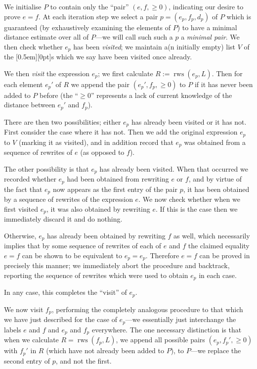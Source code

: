 \documentclass[a4paper]{article}
\DeclareMathOperator{\rws}{rws}
\theoremstyle{plain}
\theoremstyle{definition}
\newcommand{\xx}[1]{{\colorbox{gray!15}{\raisebox{0em}[0.5em][0pt]{\makebox[\width-0.4em]{\texttt{#1}}}}}}
\newcommand{\expr}{\xx{expr}}
\begin{document}
We initialise $P$ to contain only the ``pair'' $(e, f, \geq 0)$, indicating our desire to prove $e = f$. At each iteration step we select a pair $p = (e_p, f_p, d_p)$ of $P$ which is guaranteed (by exhaustively examining the elements of $P$) to have a minimal distance estimate over all of $P$---we will call such such a $p$ a \textit{minimal pair}. We then check whether $e_p$ has been \textit{visited}; we maintain a(n initially empty) list $V$ of the \expr{}s which we say have been visited once already.

We then \textit{visit} the expression $e_p$; we first calculate $R := \rws(e_p, L)$. Then for each element $e_p'$ of $R$ we append the pair $(e_p', f_p, \geq 0)$ to $P$ if it has never been added to $P$ before (the ``$\geq 0$'' represents a lack of current knowledge of the distance between $e_p'$ and $f_p$).

There are then two possibilities; either $e_p$ has already been visited or it has not. First consider the case where it has not. Then we add the original expression $e_p$ to $V$ (marking it as visited), and in addition record that $e_p$ was obtained from a sequence of rewrites of $e$ (as opposed to $f$).

The other possibility is that $e_p$ has already been visited. When that occurred we recorded whether $e_p$ had been obtained from rewriting $e$ or $f$, and by virtue of the fact that $e_p$ now appears as the first entry of the pair $p$, it has been obtained by a sequence of rewrites of the expression $e$. We now check whether when we first visited $e_p$, it was also obtained by rewriting $e$. If this is the case then we immediately discard it and do nothing.

Otherwise, $e_p$ has already been obtained by rewriting $f$ as well, which necessarily implies that by some sequence of rewrites of each of $e$ and $f$ the claimed equality $e = f$ can be shown to be equivalent to $e_p = e_p$. Therefore $e = f$ can be proved in precisely this manner; we immediately abort the procedure and backtrack, reporting the sequence of rewrites which were used to obtain $e_p$ in each case.

In any case, this completes the ``visit'' of $e_p$.

We now visit $f_p$, performing the completely analogous procedure to that which we have just described for the case of $e_p$---we essentially just interchange the labels $e$ and $f$ and $e_p$ and $f_p$ everywhere. The one necessary distinction is that when we calculate $R = \rws(f_p, L)$, we append all possible pairs $(e_p, f_p', \geq 0)$ with $f_p'$ in $R$ (which have not already been added to $P$), to $P$---we replace the second entry of $p$, and not the first.
\end{document}
